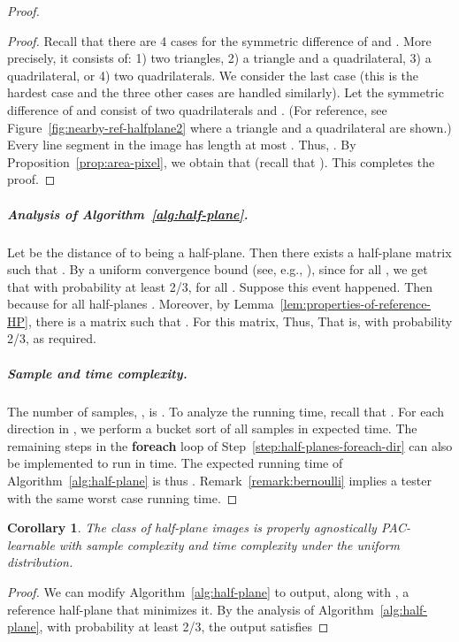 \documentclass[11pt,english]{article}
\newtheorem{corollary}[theorem]{Corollary}
\numberwithin{figure}{section}
\begin{document}
\begin{proof}
{\begin{proof}
Recall that there are 4 cases for the symmetric difference of  and . More precisely, it consists of: 1) two triangles, 2) a triangle and a quadrilateral, 3) a quadrilateral, or 4) two quadrilaterals. We consider the last case (this is the hardest case and the three other cases are handled similarly). Let the symmetric difference of  and  consist of two quadrilaterals  and . (For reference, see Figure~\ref{fig:nearby-ref-halfplane2} where a triangle and a quadrilateral are shown.) Every line segment in the image has length at most . Thus, . By Proposition~\ref{prop:area-pixel}, we obtain that  (recall that ). This completes the proof.
\end{proof}
}
\subparagraph{Analysis of Algorithm~\ref{alg:half-plane}.}
Let  be the distance of  to being a half-plane. Then there exists a half-plane matrix  such that .
By a uniform convergence bound (see, e.g., \cite{Avrim-lecture-notes}), since  for all , we get that with probability at least 2/3,
 for all . Suppose this event happened. Then  because  for all half-planes . Moreover, by Lemma~\ref{lem:properties-of-reference-HP}, there is a matrix 
such that . For this matrix,  Thus,
 That is,  with probability 2/3, as required.


\subparagraph{Sample and time complexity.} The number of samples, , is . To analyze the running time, recall that . For each direction in , we perform a bucket sort of all samples in expected  time. The remaining steps in the {\bf foreach} loop of Step~\ref{step:half-planes-foreach-dir} can also be implemented to run in  time. The expected running time of Algorithm~\ref{alg:half-plane} is thus .
Remark~\ref{remark:bernoulli} implies a tester with the same worst case running time.
\end{proof}



\ifnum{}
\begin{corollary}\label{cor:half-plane-agnostic-learner}
The class of half-plane images is properly agnostically PAC-learnable with sample complexity   and time complexity  under the uniform distribution.
\end{corollary}
\begin{proof}
We can modify Algorithm~\ref{alg:half-plane} to output, along with , a reference half-plane  that minimizes it. By the analysis of Algorithm~\ref{alg:half-plane}, with probability at least 2/3, the output  satisfies 
\end{proof}
\fi
\end{document}
